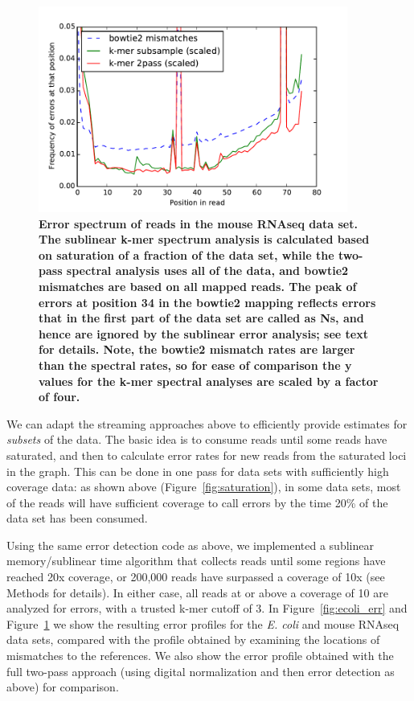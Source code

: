 \begin{figure}[!ht]
 \centerline{\includegraphics[width=4in]{./figures/rseq-errhist}}
\caption{{\bf Error spectrum of reads in the mouse RNAseq data set.
    The sublinear k-mer spectrum analysis is calculated based on
    saturation of a fraction of the data set, while the two-pass
    spectral analysis uses all of the data, and bowtie2 mismatches are
    based on all mapped reads.  The peak of errors at position 34 in
    the bowtie2 mapping reflects errors that in the first part of the
    data set are called as Ns, and hence are ignored by the sublinear
    error analysis; see text for details. Note, the bowtie2 mismatch
    rates are larger than the spectral rates, so for ease of
    comparison the y values for the k-mer spectral analyses are scaled
    by a factor of four.}}
\label{fig:rseq_err}
\end{figure}



We can adapt the streaming approaches above to efficiently provide estimates
for {\em subsets} of the data.  The basic idea is to consume reads until some
reads have saturated, and then to calculate error rates for new reads from the
saturated loci in the graph.  This can be done in one pass for data sets with
sufficiently high coverage data: as shown above (Figure~\ref{fig:saturation}),
in some data sets, most of the reads will have sufficient coverage to call
errors by the time 20\% of the data set has been consumed.

Using the same error detection code as above, we implemented a sublinear
memory/sublinear time algorithm that collects reads until some regions have
reached 20x coverage, or 200,000 reads have surpassed a coverage of 10x (see
Methods for details).  In either case, all reads at or above a coverage of 10
are analyzed for errors, with a trusted k-mer cutoff of 3.  In
Figure~\ref{fig:ecoli_err} and Figure~\ref{fig:rseq_err} we show the resulting
error profiles for the {\em E. coli} and mouse RNAseq data sets, compared with
the profile obtained by examining the locations of mismatches to the
references. We also show the error profile obtained with the full two-pass
approach (using digital normalization and then error detection as above) for
comparison.

